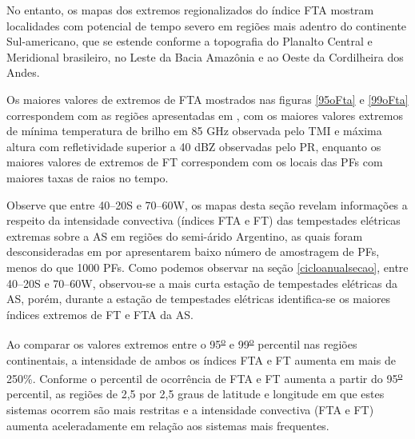 No entanto, os mapas dos extremos regionalizados do índice FTA mostram localidades com potencial de tempo severo em regiões mais adentro do continente Sul-americano, que se estende conforme a topografia do Planalto Central e Meridional brasileiro, no Leste da Bacia Amazônia e ao Oeste da Cordilheira dos Andes. 

Os maiores valores de extremos de FTA mostrados nas figuras \ref{95oFta} e \ref{99oFta} correspondem com as regiões apresentadas em 
, com os maiores valores extremos de mínima temperatura de brilho em 85 GHz observada pelo TMI e máxima altura com refletividade superior a 40 dBZ observadas pelo PR, enquanto os maiores valores de extremos de FT correspondem com os locais das PFs com maiores taxas de raios no tempo.

Observe que entre 40--20S e 70--60W, os mapas desta seção revelam informações a respeito da intensidade convectiva (índices FTA e FT) das tempestades elétricas extremas sobre a AS em regiões do semi-árido Argentino, as quais foram desconsideradas em  por apresentarem baixo número de amostragem de PFs, menos do que 1000 PFs. Como podemos observar na seção \ref{cicloanualsecao}, entre 40--20S e 70--60W, observou-se a mais curta estação de tempestades elétricas da AS, porém, durante a estação de tempestades elétricas identifica-se os maiores índices extremos de FT e FTA da AS. 

Ao comparar os valores extremos entre o 95\textsuperscript{\underline{o}} e 99\textsuperscript{\underline{o}} percentil nas regiões continentais, a intensidade de ambos os índices FTA e FT aumenta em mais de 250\%. Conforme o percentil de ocorrência de FTA e FT aumenta a partir do 95\textsuperscript{\underline{o}} percentil, as regiões de 2,5 por 2,5 graus de latitude e longitude em que estes sistemas ocorrem são mais restritas e a intensidade convectiva (FTA e FT) aumenta aceleradamente em relação aos sistemas mais frequentes.
